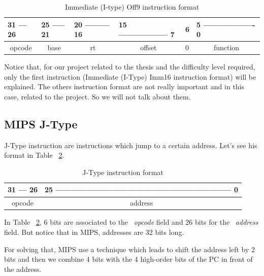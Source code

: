\documentclass[
  oneside,
  11pt, a4paper,
  footinclude=true,
  headinclude=true,
  cleardoublepage=empty
]{scrbook}
\begin{document}
\begin{table}[h!]
\centering
\begin{tabular}{l|l|l|l|l|l}
31 --- 26                    & 25 ----- 21               & 20 --------- 16         & 15 ------------------ 7     & 6 & 5 ------------------- 0       \\ \hline
\multicolumn{1}{|c|}{opcode} & \multicolumn{1}{c|}{base} & \multicolumn{1}{c|}{rt} & \multicolumn{1}{c|}{offset} & 0 & \multicolumn{1}{c|}{function} \\ \hline
\end{tabular}
\caption{Immediate (I-type) Off9 instruction format}
\label{tbl:imm_off9_instruction_format}
\end{table}

Notice that, for our project related to the thesis and the difficulty level required, only the first instruction (Immediate (I-Type) Imm16 instruction format) will be explained. The others instruction format are not really important and in this case, related to the project. So we will not talk about them.




\newpage



\subsection{MIPS J-Type}
J-Type instruction are instructions which jump to a certain address.
Let's see his format in Table ~\ref{tbl:j-type_instruction_format}.

\begin{table}[h!]
\centering
\begin{tabular}{l|l|l|l|l|l}
31 --- 26                    & \multicolumn{5}{l}{25 ----------------------------------------------------------------- 0} \\ \hline
\multicolumn{1}{|c|}{opcode} & \multicolumn{5}{c|}{address}                                                                \\ \hline
\end{tabular}
\caption{J-Type instruction format}
\label{tbl:j-type_instruction_format}
\end{table}

In Table ~\ref{tbl:j-type_instruction_format}, 6 bits are associated to the ~\textit{opcode} field and 26 bits for the ~\textit{address} field.
But notice that in MIPS, addresses are 32 bits long. 

For solving that, MIPS use a technique which leads to shift the address left by 2 bits and then we combine 4 bits with the 4 high-order bits of the PC in front of the address.
\end{document}
